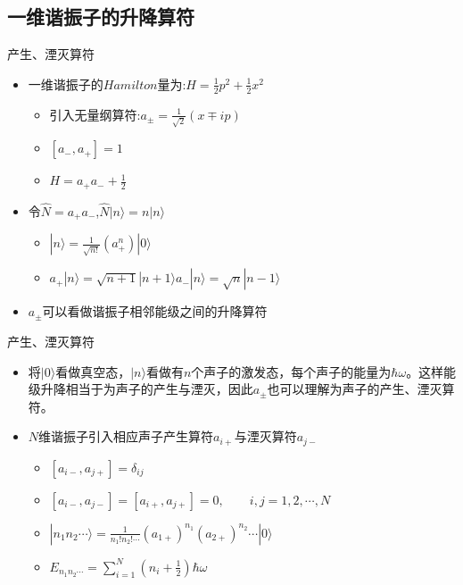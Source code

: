 \documentclass{beamer}
\begin{document}
    \subsection{一维谐振子的升降算符}
    \begin{frame}{产生、湮灭算符}
    	\begin{itemize}
    		\item 一维谐振子的$Hamilton$量为:$H=\frac{1}{2}p^{2}+\frac{1}{2}x^{2}$
    		\begin{itemize}
    			\item 引入无量纲算符:$a_{\pm}=\frac{1}{\sqrt{2}}(x\mp ip)$
    			\item $[a_{-},a_{+}]=1$
    			\item $H=a_{+}a_{-}+\frac{1}{2}$
    		\end{itemize}
    	\item 令$\hat{N}=a_{+}a_{-}$,$\hat{N}|n\rangle=n|n\rangle$
    	\begin{itemize}
    		\item $|n\rangle=\frac{1}{\sqrt{n!}}(a_{+}^{n})|0\rangle$
    		\item $a_{+}|n\rangle=\sqrt{n+1}|n+1\rangle$\qquad$a_{-}|n\rangle=\sqrt{n}|n-1\rangle$
    	\end{itemize}
    \item $a_{\pm}$可以看做谐振子相邻能级之间的升降算符
    	\end{itemize}
    \end{frame}
\begin{frame}{产生、湮灭算符}
	\begin{itemize}
		\item 将$|0\rangle$看做真空态，$|n\rangle$看做有$n$个声子的激发态，每个声子的能量为$\hbar \omega$。这样能级升降相当于为声子的产生与湮灭，因此$a_{\pm}$也可以理解为声子的产生、湮灭算符。
		\item $N$维谐振子引入相应声子产生算符$a_{i+}$与湮灭算符$a_{j-}$
		\begin{itemize}
			\item $[a_{i-},a_{j+}]=\delta_{ij}$
			\item $[a_{i-},a_{j-}]=[a_{i+},a_{j+}]=0,\qquad i,j=1,2,\cdots,N$
			\item $|n_{1}n_{2}\cdots\rangle=\frac{1}{n_{1}!n_{2}!\cdots}(a_{1+})^{n_{1}}(a_{2+})^{n_{2}}\cdots|0\rangle$
			\item $E_{n_{1}n_{2}\cdots}=\sum\limits_{i=1}^{N}(n_{i}+\frac{1}{2})\hbar \omega$
		\end{itemize}
	\end{itemize}
\end{frame}
\end{document}
